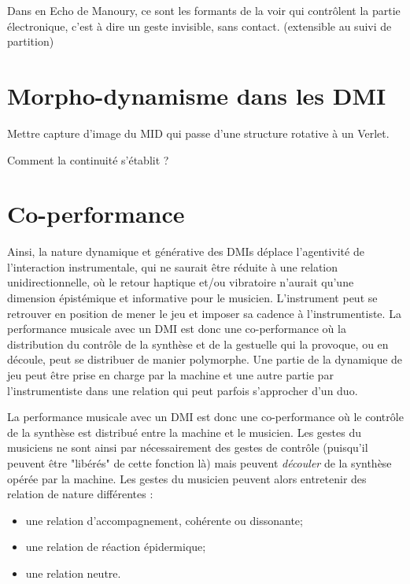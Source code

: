 Dans en Echo de Manoury, ce sont les formants de la voir qui contrôlent la partie électronique, c'est à dire un geste invisible, sans contact. (extensible au suivi de partition)


\section{Morpho-dynamisme dans les DMI}

Mettre capture d'image du MID qui passe d'une structure rotative à un Verlet.

Comment la continuité s'établit ?



\section{Co-performance}
Ainsi, la nature dynamique et générative des DMIs déplace l'agentivité de l'interaction instrumentale, qui ne saurait être réduite à une relation unidirectionnelle, où le retour haptique et/ou vibratoire n'aurait qu'une dimension épistémique et informative pour le musicien.
L'instrument peut se retrouver en position de mener le jeu et imposer sa cadence à l'instrumentiste. La performance musicale avec un DMI est donc une co-performance où la distribution du contrôle de la synthèse et de la gestuelle qui la provoque, ou en découle, peut se distribuer de manier polymorphe. Une partie de la dynamique de jeu peut être prise en charge par la machine et une autre partie par l'instrumentiste dans une relation qui peut parfois s'approcher d'un duo.

 La performance musicale avec un DMI est donc une co-performance où le contrôle de la synthèse est distribué entre la machine et le musicien. 
 Les gestes du musiciens ne sont ainsi par nécessairement des gestes de contrôle (puisqu'il peuvent être "libérés" de cette fonction là) mais peuvent \textit{découler} de la synthèse opérée par la machine. Les gestes du musicien peuvent alors entretenir des relation de nature différentes :

\vspace{-1em}
\begin{itemize}[noitemsep]
\item une relation d'accompagnement, cohérente ou dissonante;
\item une relation de réaction épidermique;
\item une relation neutre.
\end{itemize}
 



